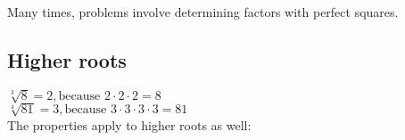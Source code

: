 \documentclass{hw}
\begin{document}
Many times, problems involve determining factors with perfect squares.

\subsection*{\normalsize Higher roots}
$\sqrt[3]{8} = 2, \text{because } 2 \cdot 2 \cdot 2 = 8$ \\
$\sqrt[4]{81} = 3, \text{because } 3 \cdot 3 \cdot 3 \cdot 3 = 81$ \\

The properties apply to higher roots as well:\\
\end{document}
